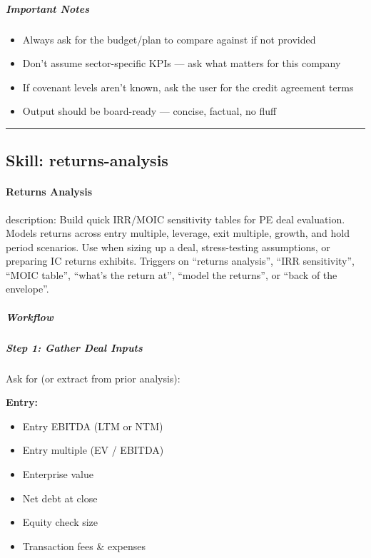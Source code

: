 \documentclass[11pt]{article}
\begin{document}
\subparagraph{Important Notes}\mbox{}\par

\begin{itemize}[leftmargin=*,itemsep=2pt,topsep=2pt]
\item {} Always ask for the budget/plan to compare against if not provided
\item {} Don't assume sector-specific KPIs — ask what matters for this company
\item {} If covenant levels aren't known, ask the user for the credit agreement terms
\item {} Output should be board-ready — concise, factual, no fluff
\end{itemize}

\vspace{0.8em}\hrule\vspace{0.8em}

\subsection{Skill: returns-analysis}\label{file:skills-returns-analysis-SKILL.md}

\paragraph{Returns Analysis}\mbox{}\par

description: Build quick IRR/MOIC sensitivity tables for PE deal evaluation. Models returns across entry multiple, leverage, exit multiple, growth, and hold period scenarios. Use when sizing up a deal, stress-testing assumptions, or preparing IC returns exhibits. Triggers on ``returns analysis'', ``IRR sensitivity'', ``MOIC table'', ``what's the return at'', ``model the returns'', or ``back of the envelope''.


\subparagraph{Workflow}\mbox{}\par

\subparagraph{Step 1: Gather Deal Inputs}\mbox{}\par

Ask for (or extract from prior analysis):


\textbf{Entry:}

\begin{itemize}[leftmargin=*,itemsep=2pt,topsep=2pt]
\item {} Entry EBITDA (LTM or NTM)
\item {} Entry multiple (EV / EBITDA)
\item {} Enterprise value
\item {} Net debt at close
\item {} Equity check size
\item {} Transaction fees \& expenses
\end{itemize}
\end{document}
